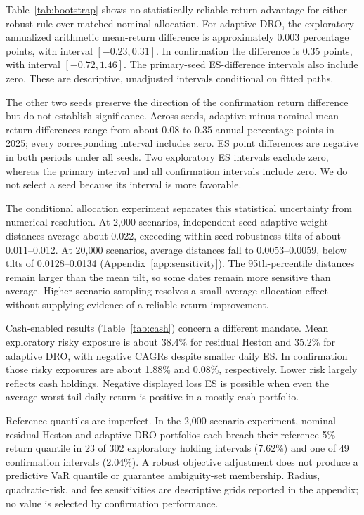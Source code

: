 Table~\ref{tab:bootstrap} shows no statistically reliable return advantage for either robust rule over matched nominal allocation. For adaptive DRO, the exploratory annualized arithmetic mean-return difference is approximately 0.003 percentage points, with interval $[-0.23,0.31]$. In confirmation the difference is 0.35 points, with interval $[-0.72,1.46]$. The primary-seed ES-difference intervals also include zero. These are descriptive, unadjusted intervals conditional on fitted paths.

The other two seeds preserve the direction of the confirmation return difference but do not establish significance. Across seeds, adaptive-minus-nominal mean-return differences range from about 0.08 to 0.35 annual percentage points in 2025; every corresponding interval includes zero. ES point differences are negative in both periods under all seeds. Two exploratory ES intervals exclude zero, whereas the primary interval and all confirmation intervals include zero. We do not select a seed because its interval is more favorable.

The conditional allocation experiment separates this statistical uncertainty from numerical resolution. At 2,000 scenarios, independent-seed adaptive-weight distances average about 0.022, exceeding within-seed robustness tilts of about 0.011--0.012. At 20,000 scenarios, average distances fall to 0.0053--0.0059, below tilts of 0.0128--0.0134 (Appendix~\ref{app:sensitivity}). The 95th-percentile distances remain larger than the mean tilt, so some dates remain more sensitive than average. Higher-scenario sampling resolves a small average allocation effect without supplying evidence of a reliable return improvement.

Cash-enabled results (Table~\ref{tab:cash}) concern a different mandate. Mean exploratory risky exposure is about 38.4\% for residual Heston and 35.2\% for adaptive DRO, with negative CAGRs despite smaller daily ES. In confirmation those risky exposures are about 1.88\% and 0.08\%, respectively. Lower risk largely reflects cash holdings. Negative displayed loss ES is possible when even the average worst-tail daily return is positive in a mostly cash portfolio.

Reference quantiles are imperfect. In the 2,000-scenario experiment, nominal residual-Heston and adaptive-DRO portfolios each breach their reference 5\% return quantile in 23 of 302 exploratory holding intervals (7.62\%) and one of 49 confirmation intervals (2.04\%). A robust objective adjustment does not produce a predictive VaR quantile or guarantee ambiguity-set membership. Radius, quadratic-risk, and fee sensitivities are descriptive grids reported in the appendix; no value is selected by confirmation performance.
